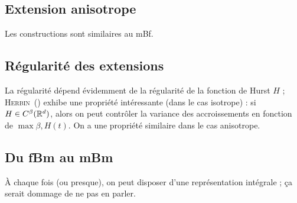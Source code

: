 \subsection{Extension anisotrope}
Les constructions sont similaires au mBf.
\subsection{Régularité des extensions}
La régularité dépend évidemment de la régularité de la fonction de
Hurst $H$ ; \textsc{Herbin}~(\cite{herbin2002}) exhibe une propriété
intéressante (dans le cas isotrope) : si $H \in C^\beta(\mathbb{R}^d)$, alors
on peut contrôler la variance des accroissements en fonction de
$\max{\beta, H(t)}$. On a une propriété similaire dans le cas
anisotrope.

\subsection{Du fBm au mBm}
\vspace{0.2em}
\begin{alert}
  À chaque fois (ou presque), on peut disposer d'une représentation
  intégrale ; ça serait dommage de ne pas en parler.
\end{alert}